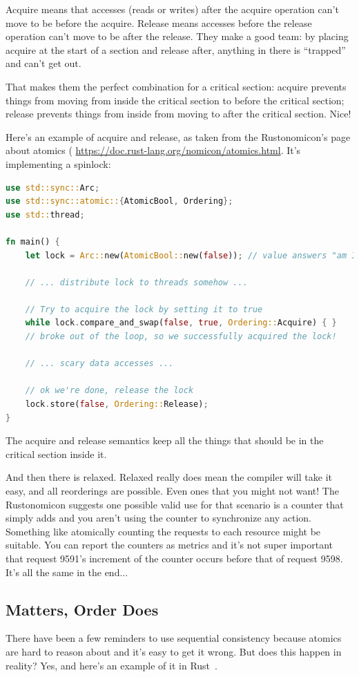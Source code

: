\documentclass[a4paper]{report}
\begin{document}
Acquire means that accesses (reads or writes) after the acquire operation can't move to be before the acquire. Release means accesses before the release operation can't move to be after the release. They make a good team: by placing acquire at the start of a section and release after, anything in there is ``trapped'' and can't get out.

That makes them the perfect combination for a critical section: acquire prevents things from moving from inside the critical section to before the critical section; release prevents things from inside from moving to after the critical section. Nice! 

Here's an example of acquire and release, as taken from the Rustonomicon's page about atomics ( \url{https://doc.rust-lang.org/nomicon/atomics.html}. It's implementing a spinlock: 

\begin{lstlisting}[language=Rust]
use std::sync::Arc;
use std::sync::atomic::{AtomicBool, Ordering};
use std::thread;

fn main() {
    let lock = Arc::new(AtomicBool::new(false)); // value answers "am I locked?"

    // ... distribute lock to threads somehow ...

    // Try to acquire the lock by setting it to true
    while lock.compare_and_swap(false, true, Ordering::Acquire) { }
    // broke out of the loop, so we successfully acquired the lock!

    // ... scary data accesses ...

    // ok we're done, release the lock
    lock.store(false, Ordering::Release);
}
\end{lstlisting}

The acquire and release semantics keep all the things that should be in the critical section inside it.

And then there is relaxed. Relaxed really does mean the compiler will take it easy, and all reorderings are possible. Even ones that you might not want! The Rustonomicon suggests one possible valid use for that scenario is a counter that simply adds and you aren't using the counter to synchronize any action. Something like atomically counting the requests to each resource might be suitable. You can report the counters as metrics and it's not super important that request 9591's increment of the counter occurs before that of request 9598. It's all the same in the end...

\subsection*{Matters, Order Does}
There have been a few reminders to use sequential consistency because atomics are hard to reason about and it's easy to get it wrong. But does this happen in reality? Yes, and here's an example of it in Rust~\cite{weakbug}.
\end{document}
